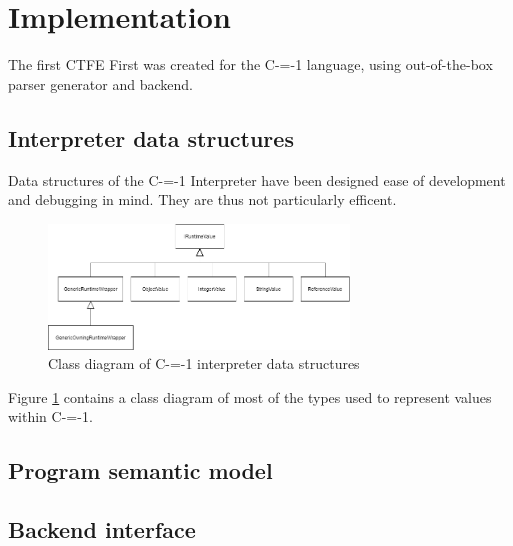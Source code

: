 \section{Implementation}
\label{implementation}

The first CTFE First was created for the C-=-1 language, using out-of-the-box parser generator and backend.

\subsection{Interpreter data structures}

Data structures of the C-=-1 Interpreter have been designed ease of development and debugging in mind.
They are thus not particularly efficent.

\begin{figure}
	\includegraphics[width=8cm]{pictures/interpreter_data_structures_uml.png}
	\caption{Class diagram of C-=-1 interpreter data structures}
	\label{fig:interpreter_data_structures}
\end{figure}

Figure \ref{fig:interpreter_data_structures} contains a class diagram of most of the types used to represent values within C-=-1.




\subsection{Program semantic model}

\subsection{Backend interface}
\label{implementation/backend-interface}
